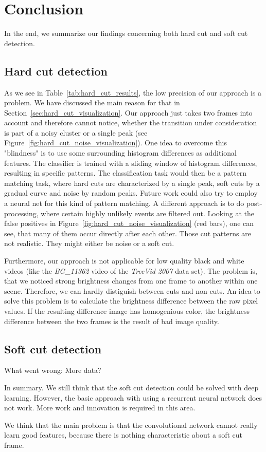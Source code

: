 \section{Conclusion}
\label{sec:conclusion}
In the end, we summarize our findings concerning both hard cut and soft cut detection.

\subsection{Hard cut detection}
\label{sec:conclusion_hard_cut}

As we see in Table~\ref{tab:hard_cut_results}, the low precision of our approach is a problem. 
We have discussed the main reason for that in Section~\ref{sec:hard_cut_visualization}.
Our approach just takes two frames into account and therefore cannot notice, whether the transition under consideration is part of a noisy cluster or a single peak (see Figure~\ref{fig:hard_cut_noise_visualization}).
One idea to overcome this "blindness" is to use some surrounding histogram differences as additional features. 
The classifier is trained with a sliding window of histogram differences, resulting in specific patterns. 
The classification task would then be a pattern matching task, where hard cuts are characterized by a single peak, soft cuts by a gradual curve and noise by random peaks. 
Future work could also try to employ a neural net for this kind of pattern matching.
A different approach is to do post-processing, where certain highly unlikely events are filtered out. 
Looking at the false positives in Figure~\ref{fig:hard_cut_noise_visualization} (red bars), one can see, that many of them occur directly after each other.
Those cut patterns are not realistic.
They might either be noise or a soft cut.

Furthermore, our approach is not applicable for low quality black and white videos (like the \emph{BG\_11362} video of the \emph{TrecVid 2007} data set).
The problem is, that we noticed strong brightness changes from one frame to another within one scene. 
Therefore, we can hardly distiguish between cuts and non-cuts.
An idea to solve this problem is to calculate the brightness difference between the raw pixel values.
If the resulting difference image has homogenious color, the brightness difference between the two frames is the result of bad image quality.


\subsection{Soft cut detection}
\label{sec:conclusion_hard_cut}

What went wrong:
More data?

In summary.
We still think that the soft cut detection could be solved with deep learning.
However, the basic approach with using a recurrent neural network does not work.
More work and innovation is required in this area.

We think that the main problem is that the convolutional network cannot really learn good features, because there is nothing characteristic about a soft cut frame.
